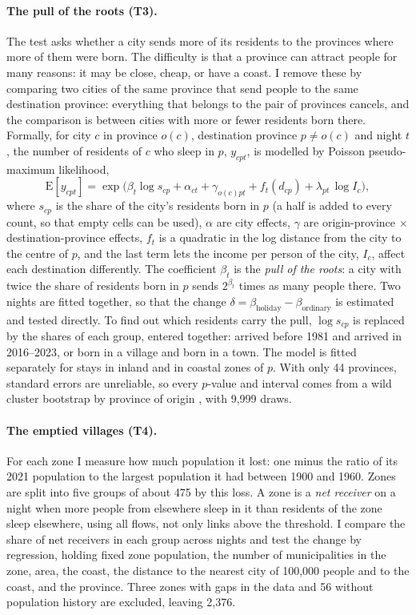 \paragraph{The pull of the roots (T3).} The test asks whether a city sends more of its residents to the provinces where more of them were born. The difficulty is that a province can attract people for many reasons: it may be close, cheap, or have a coast. I remove these by comparing two cities of the same province that send people to the same destination province: everything that belongs to the pair of provinces cancels, and the comparison is between cities with more or fewer residents born there. Formally, for city $c$ in province $o(c)$, destination province $p\neq o(c)$ and night $t$, the number of residents of $c$ who sleep in $p$, $y_{cpt}$, is modelled by Poisson pseudo-maximum likelihood,
\begin{equation}
\mathrm{E}[y_{cpt}] = \exp\big(\beta_t \log s_{cp} + \alpha_{ct} + \gamma_{o(c)pt} + f_t(d_{cp}) + \lambda_{pt}\,\log I_c\big),
\label{eq:ppml}
\end{equation}
where $s_{cp}$ is the share of the city's residents born in $p$ (a half is added to every count, so that empty cells can be used), $\alpha$ are city effects, $\gamma$ are origin-province $\times$ destination-province effects, $f_t$ is a quadratic in the log distance from the city to the centre of $p$, and the last term lets the income per person of the city, $I_c$, affect each destination differently. The coefficient $\beta_t$ is the \emph{pull of the roots}: a city with twice the share of residents born in $p$ sends $2^{\beta_t}$ times as many people there. Two nights are fitted together, so that the change $\delta=\beta_{\text{holiday}}-\beta_{\text{ordinary}}$ is estimated and tested directly. To find out which residents carry the pull, $\log s_{cp}$ is replaced by the shares of each group, entered together: arrived before 1981 and arrived in 2016--2023, or born in a village and born in a town. The model is fitted separately for stays in inland and in coastal zones of $p$. With only 44 provinces, standard errors are unreliable, so every $p$-value and interval comes from a wild cluster bootstrap by province of origin \citep{kline2012score}, with 9,999 draws.

\paragraph{The emptied villages (T4).} For each zone I measure how much population it lost: one minus the ratio of its 2021 population to the largest population it had between 1900 and 1960. Zones are split into five groups of about 475 by this loss. A zone is a \emph{net receiver} on a night when more people from elsewhere sleep in it than residents of the zone sleep elsewhere, using all flows, not only links above the threshold. I compare the share of net receivers in each group across nights and test the change by regression, holding fixed zone population, the number of municipalities in the zone, area, the coast, the distance to the nearest city of 100,000 people and to the coast, and the province. Three zones with gaps in the data and 56 without population history are excluded, leaving 2,376.

